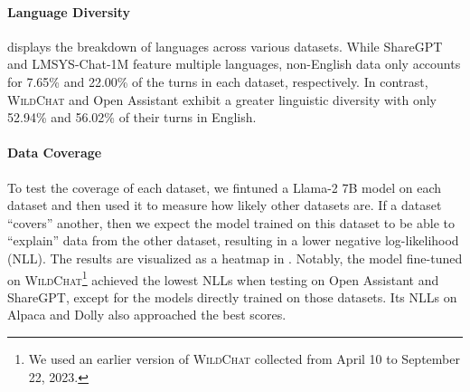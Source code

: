 \documentclass{article} %
\newcommand{\corpus}{\textsc{WildChat}\xspace}
\begin{document}
\paragraph{Language Diversity}
 displays the breakdown of languages across various datasets. While ShareGPT and LMSYS-Chat-1M feature multiple languages, non-English data only accounts for 7.65\% and 22.00\% of the turns in each dataset, respectively. In contrast, \corpus and Open Assistant exhibit a greater linguistic diversity with only 52.94\% and 56.02\% of their turns in English.

\paragraph{Data Coverage}
To test the coverage of each dataset, we fintuned a Llama-2 7B model on each dataset and then used it to measure how likely other datasets are. If a dataset ``covers'' another, then we expect the model trained on this dataset to be able to ``explain'' data from the other dataset, resulting in a lower negative log-likelihood (NLL). The results are visualized as a heatmap in . %
Notably, the model fine-tuned on \corpus\footnote{We used an earlier version of \corpus collected from April 10 to September 22, 2023.} achieved the lowest NLLs when testing on Open Assistant and ShareGPT, except for the models directly trained on those datasets. Its NLLs on Alpaca and Dolly also approached the best scores.
\end{document}
